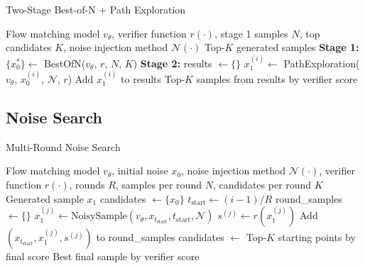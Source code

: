 \documentclass{article}
\begin{document}
\begin{algorithm}[H]
\caption{Two-Stage Best-of-N + Path Exploration}
\label{alg:best-of-n-path-exploration}
\begin{algorithmic}[1]
\Require Flow matching model $v_\theta$, verifier function $r(\cdot)$, stage 1 samples $N$, top candidates $K$, noise injection method $\mathcal{N}(\cdot)$
\Ensure Top-$K$ generated samples
\State \textbf{Stage 1:} $\{x_0^*\} \leftarrow$ BestOfN($v_\theta$, $r$, $N$, $K$) 
\State \textbf{Stage 2:} results $\leftarrow \{\}$
    \State $x_1^{(i)} \leftarrow$ PathExploration($v_\theta$, $x_0^{(i)}$, $\mathcal{N}$, $r$) 
    \State Add $x_1^{(i)}$ to results
\EndFor
\State \Return Top-$K$ samples from results by verifier score
\end{algorithmic}
\end{algorithm}

\subsection{Noise Search}

\begin{algorithm}[H]
\caption{Multi-Round Noise Search}
\label{alg:noise-search}
\begin{algorithmic}[1]
\Require Flow matching model $v_\theta$, initial noise $x_0$, noise injection method $\mathcal{N}(\cdot)$, verifier function $r(\cdot)$, rounds $R$, samples per round $N$, candidates per round $K$
\Ensure Generated sample $x_1$
\State candidates $\leftarrow \{x_0\}$ 
    \State $t_{\text{start}} \leftarrow (i-1) / R$ 
    \State round\_samples $\leftarrow \{\}$
            \State $x_1^{(j)} \leftarrow \text{NoisySample}(v_\theta, x_{t_{\text{start}}}, t_{\text{start}}, \mathcal{N})$
            \State $s^{(j)} \leftarrow r(x_1^{(j)})$
            \State Add $(x_{t_{\text{start}}}, x_1^{(j)}, s^{(j)})$ to round\_samples
        \EndFor
    \EndFor
        \State candidates $\leftarrow$ Top-$K$ starting points by final score
    \Else
        \State \Return Best final sample by verifier score
    \EndIf
\EndFor
\end{algorithmic}
\end{algorithm}
\end{document}
